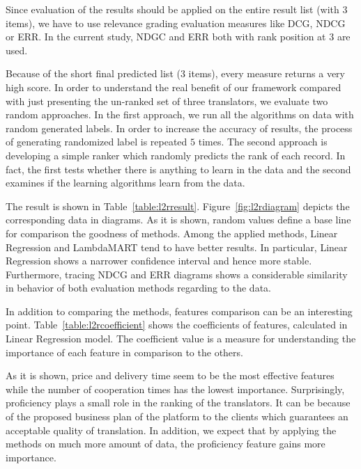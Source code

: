 Since evaluation of the results should be applied on  the entire result list (with $3$ items), we have to use relevance grading evaluation measures like DCG, NDCG or ERR. In the current study, NDGC and ERR both with rank position at $3$ are used.

Because of the short final predicted list ($3$ items), every  measure returns a very high score. In order to understand the real benefit of our framework compared with just presenting the un-ranked set of three translators, we evaluate two random approaches. In the first approach, we run all the algorithms on data with random generated labels. In order to increase the accuracy of results, the process of generating randomized label is repeated $5$ times. The second approach is developing a simple ranker which randomly predicts the rank of each record. In fact, the first tests whether there is anything to learn in the data and the second examines if the learning algorithms learn from the data.

The result is shown in Table~\ref{table:l2rresult}.  Figure~\ref{fig:l2rdiagram} depicts the corresponding data in diagrams. As it is shown, random values define a base line for comparison the goodness of methods. Among the applied methods, Linear Regression and LambdaMART tend to have better results. In particular, Linear Regression shows a narrower confidence interval and hence more stable. Furthermore, tracing NDCG and ERR diagrams shows a considerable similarity in behavior of both evaluation methods regarding to the data.

In addition to comparing the methods, features comparison can be an interesting point. Table~\ref{table:l2rcoefficient} shows the coefficients of features, calculated in Linear Regression model. The coefficient value is a measure for understanding the importance of each feature in comparison to the others. 

As it is shown, price and delivery time seem to be the most effective features while the number of cooperation times has the lowest importance. Surprisingly, proficiency plays a small role in the ranking of the translators. It can be because of the proposed business plan of the platform to the clients which guarantees an acceptable quality of translation. In addition, we expect that by applying the methods on much more amount of data, the proficiency feature gains more importance.

